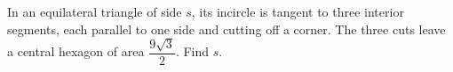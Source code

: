 In an equilateral triangle of side $s$, its incircle is tangent to three interior segments, each parallel to one side and cutting off a corner. The three cuts leave a central hexagon of area $\dfrac{9\sqrt3}{2}$. Find $s$.
